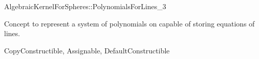 \begin{ccRefConcept}{AlgebraicKernelForSpheres::PolynomialsForLines_3}

\ccDefinition

Concept to represent a system of polynomials on 
capable of storing equations of lines. 

\ccRefines
CopyConstructible, Assignable, DefaultConstructible






\ccHasModels


\ccSeeAlso


\end{ccRefConcept}
